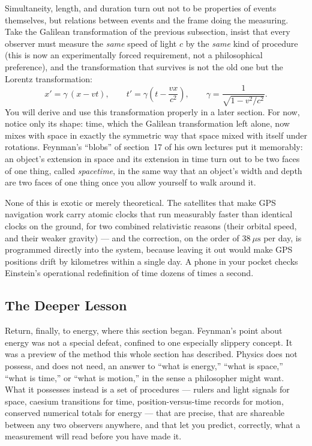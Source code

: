 Simultaneity, length, and duration turn out not to be properties of events
themselves, but relations between events and the frame doing the measuring.
Take the Galilean transformation of the previous subsection, insist that every
observer must measure the \emph{same} speed of light $c$ by the \emph{same}
kind of procedure (this is now an experimentally forced requirement, not a
philosophical preference), and the transformation that survives is not the old
one but the Lorentz transformation:
\[
  x' = \gamma\,(x - vt), \qquad t' = \gamma\left(t - \frac{vx}{c^2}\right),
  \qquad \gamma = \frac{1}{\sqrt{1 - v^2/c^2}}.
\]
You will derive and use this transformation properly in a later section. For
now, notice only its shape: time, which the Galilean transformation left alone,
now mixes with space in exactly the symmetric way that space mixed with itself
under rotations. Feynman's ``blobs'' of section~17 of his own lectures put it
memorably: an object's extension in space and its extension in time turn out to
be two faces of one thing, called \emph{spacetime}, in the same way that an
object's width and depth are two faces of one thing once you allow yourself to
walk around it.

None of this is exotic or merely theoretical. The satellites that make GPS
navigation work carry atomic clocks that run measurably faster than identical
clocks on the ground, for two combined relativistic reasons (their orbital
speed, and their weaker gravity) --- and the correction, on the order of $38\
\mu\text{s}$ per day, is programmed directly into the system, because leaving
it out would make GPS positions drift by kilometres within a single day. A
phone in your pocket checks Einstein's operational redefinition of time dozens
of times a second.

\subsection{The Deeper Lesson}

Return, finally, to energy, where this section began. Feynman's point about
energy was not a special defeat, confined to one especially slippery concept.
It was a preview of the method this whole section has described. Physics does
not possess, and does not need, an answer to ``what is energy,'' ``what is
space,'' ``what is time,'' or ``what is motion,'' in the sense a philosopher
might want. What it possesses instead is a set of procedures --- rulers and
light signals for space, caesium transitions for time, position-versus-time
records for motion, conserved numerical totals for energy --- that are precise,
that are shareable between any two observers anywhere, and that let you
predict, correctly, what a measurement will read before you have made it.

